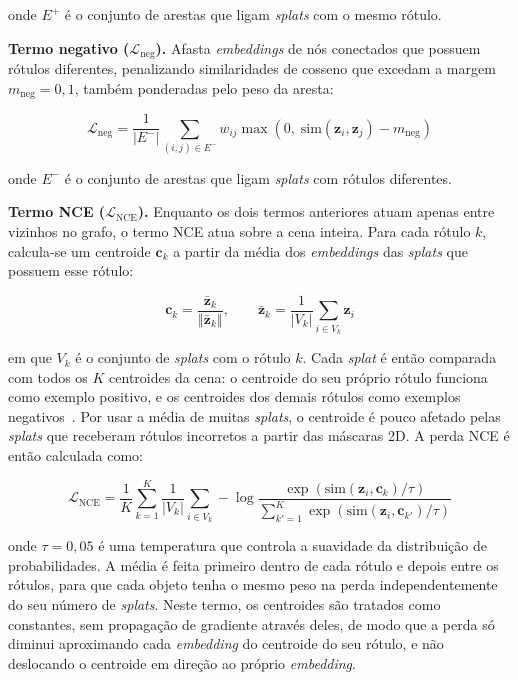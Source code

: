 onde $E^{+}$ é o conjunto de arestas que ligam \emph{splats} com o mesmo rótulo.

\noindent\textbf{Termo negativo ($\mathcal{L}_{\text{neg}}$).} Afasta \textit{embeddings} de nós conectados que possuem rótulos diferentes, penalizando similaridades de cosseno que excedam a margem $m_{\text{neg}} = 0{,}1$, também ponderadas pelo peso da aresta:

\[
\mathcal{L}_{\text{neg}} = \frac{1}{|E^{-}|} \sum_{(i,j) \in E^{-}} w_{ij} \max\left(0,\; \text{sim}(\mathbf{z}_i, \mathbf{z}_j) - m_{\text{neg}}\right)
\]

onde $E^{-}$ é o conjunto de arestas que ligam \emph{splats} com rótulos diferentes. 

\noindent\textbf{Termo NCE ($\mathcal{L}_{\text{NCE}}$).} Enquanto os dois termos anteriores atuam apenas entre vizinhos no grafo, o termo NCE atua sobre a cena inteira. Para cada rótulo $k$, calcula-se um centroide $\mathbf{c}_k$ a partir da média dos \textit{embeddings} das \emph{splats} que possuem esse rótulo:

\[
\mathbf{c}_k = \frac{\bar{\mathbf{z}}_k}{\left\Vert \bar{\mathbf{z}}_k \right\Vert}, \qquad \bar{\mathbf{z}}_k = \frac{1}{|V_k|} \sum_{i \in V_k} \mathbf{z}_i
\]

em que $V_k$ é o conjunto de \emph{splats} com o rótulo $k$. Cada \emph{splat} é então comparada com todos os $K$ centroides da cena: o centroide do seu próprio rótulo funciona como exemplo positivo, e os centroides dos demais rótulos como exemplos negativos~\cite{snell2017prototypical,li2021prototypical}. Por usar a média de muitas \emph{splats}, o centroide é pouco afetado pelas \emph{splats} que receberam rótulos incorretos a partir das máscaras 2D. A perda NCE é então calculada como:

\[
\mathcal{L}_{\text{NCE}} = \frac{1}{K} \sum_{k=1}^{K} \frac{1}{|V_k|} \sum_{i \in V_k} -\log \frac{\exp\left(\text{sim}(\mathbf{z}_i, \mathbf{c}_k)/\tau\right)}{\sum_{k'=1}^{K} \exp\left(\text{sim}(\mathbf{z}_i, \mathbf{c}_{k'})/\tau\right)}
\]

onde $\tau = 0{,}05$ é uma temperatura que controla a suavidade da distribuição de probabilidades. A média é feita primeiro dentro de cada rótulo e depois entre os rótulos, para que cada objeto tenha o mesmo peso na perda independentemente do seu número de \emph{splats}. Neste termo, os centroides são tratados como constantes, sem propagação de gradiente através deles, de modo que a perda só diminui aproximando cada \textit{embedding} do centroide do seu rótulo, e não deslocando o centroide em direção ao próprio \textit{embedding}.


